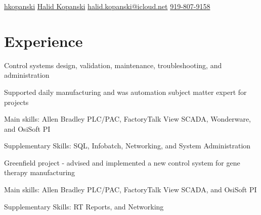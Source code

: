 \documentclass[]{plushcv}
\begin{document}
%
%

{\contactline
{\href{}{}}
{\href{https://github.com/hkopanski}{hkopanski}}
{\href{https://www.linkedin.com/in/halidkopanski/}{Halid Kopanski}}
{\href{mailto:halid.kopanski@icloud.net}{halid.kopanski@icloud.net}}
{\href{tel:919-807-9158}{919-807-9158}}
}

%
%

\begin{minipage}[t]{0.70\textwidth} 



\section{Experience}
\vspace{\topsep} %
\begin{tightemize}
\sectionsep
  \item {Control systems design, validation, maintenance, troubleshooting, and administration}
  \item {Supported daily manufacturing and was automation subject matter expert for projects}  
  \item {Main skills: Allen Bradley PLC/PAC, FactoryTalk View SCADA, Wonderware, and OsiSoft PI}
  \item {Supplementary Skills: SQL, Infobatch, Networking, and System Administration}
\end{tightemize}
\sectionsep

\begin{tightemize}
\sectionsep
    \item {Greenfield project - advised and implemented a new control system for gene therapy manufacturing}
    \item {Main skills: Allen Bradley PLC/PAC, FactoryTalk View SCADA, and OsiSoft PI}
    \item {Supplementary Skills: RT Reports, and Networking}
\end{tightemize}
\sectionsep


\end{minipage}
\end{document}
